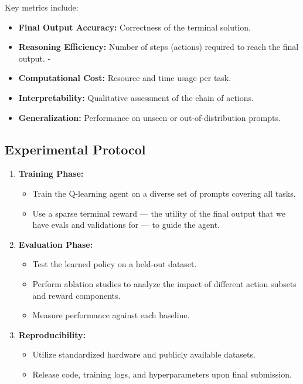 \documentclass[10pt,journal,compsoc]{IEEEtran}
\begin{document}
Key metrics include:

\begin{itemize}
\item \textbf{Final Output Accuracy:} Correctness of the terminal solution.
\item \textbf{Reasoning Efficiency:} Number of steps (actions) required to reach the final output. -
\item \textbf{Computational Cost:} Resource and time usage per task.
\item \textbf{Interpretability:} Qualitative assessment of the chain of actions.
\item \textbf{Generalization:} Performance on unseen or out-of-distribution prompts.
\end{itemize}

\subsection{Experimental Protocol}

\begin{enumerate}
\item
  \textbf{Training Phase:}
  \begin{itemize}
  \item
    Train the Q-learning agent on a diverse set of prompts covering all
    tasks.
  \item
    Use a sparse terminal reward --- the utility of the final output that
    we have evals and validations for --- to guide the agent.
  \end{itemize}
\item
  \textbf{Evaluation Phase:}

  \begin{itemize}
  \item
    Test the learned policy on a held-out dataset.
  \item
    Perform ablation studies to analyze the impact of different action
    subsets and reward components.
  \item
    Measure performance against each baseline.
  \end{itemize}
\item
  \textbf{Reproducibility:}

  \begin{itemize}
  \item
    Utilize standardized hardware and publicly available datasets.
  \item
    Release code, training logs, and hyperparameters upon final
    submission.
  \end{itemize}
\end{enumerate}
\end{document}
